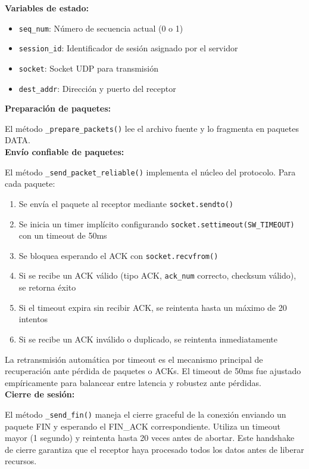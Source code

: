 \textbf{Variables de estado:}
\begin{itemize}
    \item \texttt{seq\_num}: Número de secuencia actual (0 o 1)
    \item \texttt{session\_id}: Identificador de sesión asignado por el servidor
    \item \texttt{socket}: Socket UDP para transmisión
    \item \texttt{dest\_addr}: Dirección y puerto del receptor
\end{itemize}

 
\textbf{Preparación de paquetes:}

El método \texttt{\_prepare\_packets()} lee el archivo fuente y lo fragmenta en paquetes DATA.
\\

\textbf{Envío confiable de paquetes:}

El método \texttt{\_send\_packet\_reliable()} implementa el núcleo del protocolo. Para cada paquete:

\begin{enumerate}
    \item Se envía el paquete al receptor mediante \texttt{socket.sendto()}
    \item Se inicia un timer implícito configurando \texttt{socket.settimeout(SW\_TIMEOUT)} con un timeout de 50ms
    \item Se bloquea esperando el ACK con \texttt{socket.recvfrom()}
    \item Si se recibe un ACK válido (tipo ACK, \texttt{ack\_num} correcto, checksum válido), se retorna éxito
    \item Si el timeout expira sin recibir ACK, se reintenta hasta un máximo de 20 intentos
    \item Si se recibe un ACK inválido o duplicado, se reintenta inmediatamente
\end{enumerate}

La retransmisión automática por timeout es el mecanismo principal de recuperación ante pérdida de paquetes o ACKs. El timeout de 50ms fue ajustado empíricamente para balancear entre latencia y robustez ante pérdidas.
\\

\textbf{Cierre de sesión:}

El método \texttt{\_send\_fin()} maneja el cierre graceful de la conexión enviando un paquete FIN y esperando el FIN\_ACK correspondiente. Utiliza un timeout mayor (1 segundo) y reintenta hasta 20 veces antes de abortar. Este handshake de cierre garantiza que el receptor haya procesado todos los datos antes de liberar recursos.

